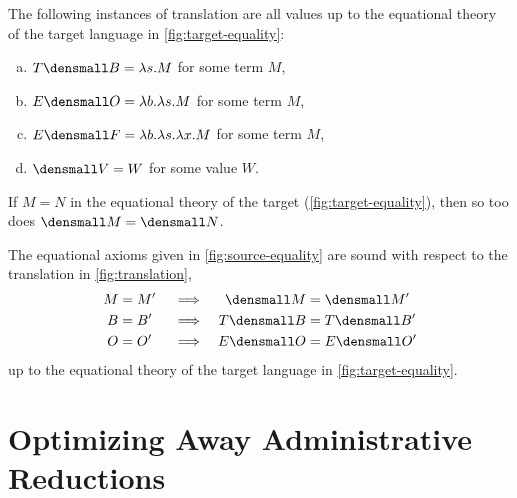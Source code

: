 \documentclass[runningheads]{llncs}
\begin{document}
\begin{lemma}
  The following instances of translation are all values up to the equational
  theory of the target language in \cref{fig:target-equality}:
  \begin{enumerate}[(a)]
  \item $T\den{B} = \lambda s. M$ for some term $M$,
  \item $E\den{O} = \lambda b. \lambda s. M$ for some term $M$,
  \item $E\den{F} = \lambda b. \lambda s. \lambda x. M$ for some term $M$,
  \item $\den{V} = W$ for some value $W$.
  \end{enumerate}
\end{lemma}

\begin{proposition}
  If $M = N$ in the equational theory of the target
  (\cref{fig:target-equality}), then so too does $\den{M} = \den{N}$.
\end{proposition}

\begin{proposition}[Soundness]
  The equational axioms given in \cref{fig:source-equality} are sound with
  respect to the translation in \cref{fig:translation},
  \begin{align*}
    M &= M' &&\implies & \den{M} &= \den{M'} \\
    B &= B' &&\implies & T\den{B} &= T\den{B'} \\
    O &= O' &&\implies & E\den{O} &= E\den{O'}
  \end{align*}
  up to the equational theory of the target language in
  \cref{fig:target-equality}.
\end{proposition}

\section{Optimizing Away Administrative Reductions} \label{sec-opt}
\end{document}
